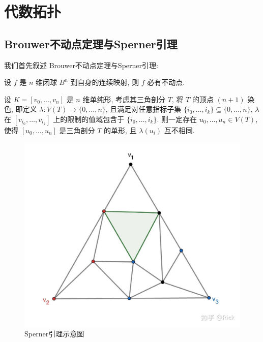 \chapter{代数拓扑}
    \section{Brouwer不动点定理与Sperner引理}
    我们首先叙述 Brouwer不动点定理与Sperner引理:
    \begin{theorem}[Brouwer不动点定理]
        设 $f$ 是 $n$ 维闭球 $B^n$ 到自身的连续映射, 则 $f$ 必有不动点.
    \end{theorem}
    \begin{lemma}[Sperner引理]
        设 $K=[v_0,\dots,v_n]$ 是 $n$ 维单纯形, 考虑其三角剖分 $T$, 将 $T$ 的顶点 $(n+1)$ 染色, 即定义 $\lambda:V(T)\rightarrow\{0,\dots,n\}$, 且满足对任意指标子集
        $\{i_0,\dots,i_k\}\subseteq\{0,\dots,n\}$, $\lambda$ 在 $[v_{i_0},\dots,v_{i_k}]$ 上的限制的值域包含于 $\{i_0,\dots,i_k\}$. 则一定存在 $u_0,\dots,u_n\in V(T)$, 
        使得 $[u_0,\dots,u_n]$ 是三角剖分 $T$ 的单形, 且 $\lambda(u_i)$ 互不相同.
        \begin{figure}[hbtp]
            \centering
            \includegraphics[scale=0.2]{Figures/SpernerLemma.jpg}
            \caption[SpernerLemma]{Sperner引理示意图}
        \end{figure}
    \end{lemma}


